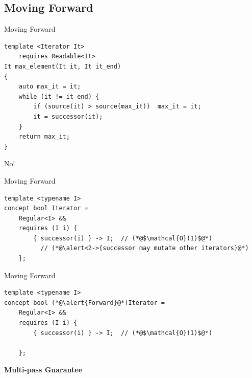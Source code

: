 \documentclass[aspectratio=169]{beamer}
\begin{document}


\subsection{Moving Forward}

\begin{frame}[fragile]{Moving Forward}
  \pause{}

\begin{lstlisting}
template <Iterator It>
    requires Readable<It>
It max_element(It it, It it_end)
{
    auto max_it = it;
    while (it != it_end) {
        if (source(it) > source(max_it))  max_it = it;
        it = successor(it);
    }
    return max_it;
}
\end{lstlisting}
  \pause{}
  \centerline{\Huge No!}
\end{frame}


\begin{frame}[fragile]{Moving Forward}
\begin{lstlisting}
template <typename I>
concept bool Iterator =
    Regular<I> &&
    requires (I i) {
        { successor(i) } -> I;  // (*@$\mathcal{O}(1)$@*)
          // (*@\alert<2->{successor may mutate other iterators}@*)
    };
\end{lstlisting}
\end{frame}


\begin{frame}[fragile]{Moving Forward}
\begin{lstlisting}
template <typename I>
concept bool (*@\alert{Forward}@*)Iterator =
    Regular<I> &&
    requires (I i) {
        { successor(i) } -> I;  // (*@$\mathcal{O}(1)$@*)

    };
\end{lstlisting}

  \pause{}
  \centerline{\Large \textbf{Multi-pass Guarantee}}
\end{frame}

\end{document}
